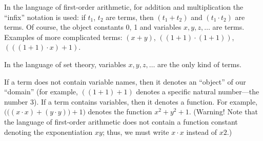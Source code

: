 \begin{ex}[]
In the language of first-order arithmetic, for addition and multiplication the ``infix'' notation is used: if \(t_1\), \(t_2\) are terms, then \((t_1+t_2)\) and \((t_1\cdot t_2)\) are terms.
Of course, the object constants 0, 1 and variables \(x, y, z, \ldots\) are terms.
Examples of more complicated terms: \((x+y)\), \(((1+1)\cdot (1+1))\), \((((1+1)\cdot x)+1)\).
\end{ex}

\begin{ex}[]
In the language of set theory, variables \(x, y, z, \ldots\)  are the only kind of terms.
\end{ex}

If a term does not contain variable names, then it denotes an ``object'' of our ``domain'' (for example, \(((1+1)+1)\) denotes a specific natural number---the number 3).
If a term contains variables, then it denotes a function.
For example, \(\Big(\big((x\cdot x)+(y\cdot y)\big)+1\Big)\) denotes the function \(x^2+y^2+1.\)
(Warning! Note that the language of first-order arithmetic does not contain a function constant denoting the exponentiation \(xy\); thus, we must write \(x\cdot x\) instead of \(x2\).)


